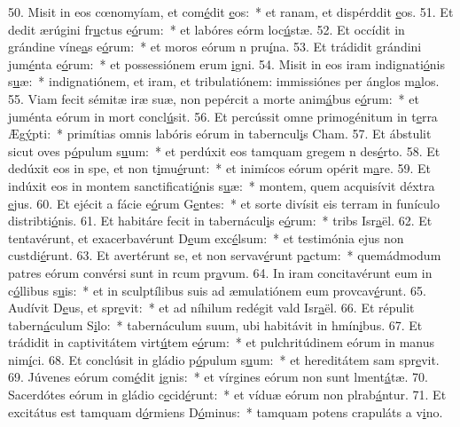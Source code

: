 50. Misit in eos cœnomyíam, et com\uline{é}dit \uline{e}os:~* et ranam, et dispérddit \uline{e}os.
51. Et dedit ærúgini fr\uline{u}ctus e\uline{ó}rum:~* et labóres eórm loc\uline{ú}stæ.
52. Et occídit in grándine víne\uline{a}s e\uline{ó}rum:~* et moros eórum n pru\uline{í}na.
53. Et trádidit grándini jum\uline{é}nta e\uline{ó}rum:~* et possessiónem erum \uline{i}gni.
54. Misit in eos iram indignati\uline{ó}nis s\uline{u}æ:~* indignatiónem, et iram, et tribulatiónem: immissiónes per ánglos m\uline{a}los.
55. Viam fecit sémitæ iræ suæ, non pepércit a morte anim\uline{á}bus e\uline{ó}rum:~* et juménta eórum in mort concl\uline{ú}sit.
56. Et percússit omne primogénitum in t\uline{e}rra Æg\uline{ý}pti:~* primítias omnis labóris eórum in taberncul\uline{i}s Cham.
57. Et ábstulit sicut oves p\uline{ó}pulum s\uline{u}um:~* et perdúxit eos tamquam gregem n des\uline{é}rto.
58. Et dedúxit eos in spe, et non t\uline{i}mu\uline{é}runt:~* et inimícos eórum opérit m\uline{a}re.
59. Et indúxit eos in montem sanctificati\uline{ó}nis s\uline{u}æ:~* montem, quem acquisívit déxtra \uline{e}jus.
60. Et ejécit a fácie e\uline{ó}rum G\uline{e}ntes:~* et sorte divísit eis terram in funículo distribti\uline{ó}nis.
61. Et habitáre fecit in tabernácul\uline{i}s e\uline{ó}rum:~* tribs Isr\uline{a}ël.
62. Et tentavérunt, et exacerbavérunt D\uline{e}um exc\uline{é}lsum:~* et testimónia ejus non custdi\uline{é}runt.
63. Et avertérunt se, et non servav\uline{é}runt p\uline{a}ctum:~* quemádmodum patres eórum convérsi sunt in rcum pr\uline{a}vum.
64. In iram concitavérunt eum in c\uline{ó}llibus s\uline{u}is:~* et in sculptílibus suis ad æmulatiónem eum provcav\uline{é}runt.
65. Audívit D\uline{e}us, et spr\uline{e}vit:~* et ad níhilum redégit vald Isr\uline{a}ël.
66. Et répulit tabern\uline{á}culum S\uline{i}lo:~* tabernáculum suum, ubi habitávit in hmín\uline{i}bus.
67. Et trádidit in captivitátem virt\uline{ú}tem e\uline{ó}rum:~* et pulchritúdinem eórum in manus nim\uline{í}ci.
68. Et conclúsit in gládio p\uline{ó}pulum s\uline{u}um:~* et hereditátem sam spr\uline{e}vit.
69. Júvenes eórum com\uline{é}dit \uline{i}gnis:~* et vírgines eórum non sunt lment\uline{á}tæ.
70. Sacerdótes eórum in gládio c\uline{e}cid\uline{é}runt:~* et víduæ eórum non plrab\uline{á}ntur.
71. Et excitátus est tamquam d\uline{ó}rmiens D\uline{ó}minus:~* tamquam potens crapuláts a v\uline{i}no.
